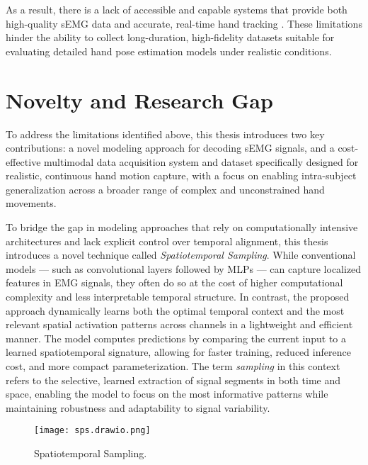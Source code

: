 As a result, there is a lack of accessible and capable systems that provide both high-quality sEMG data and accurate, real-time hand tracking \cite{graf2023combining}. These limitations hinder the ability to collect long-duration, high-fidelity datasets suitable for evaluating detailed hand pose estimation models under realistic conditions.

\section{Novelty and Research Gap}

To address the limitations identified above, this thesis introduces two key contributions: a novel modeling approach for decoding sEMG signals, and a cost-effective multimodal data acquisition system and dataset specifically designed for realistic, continuous hand motion capture, with a focus on enabling intra-subject generalization across a broader range of complex and unconstrained hand movements.

To bridge the gap in modeling approaches that rely on computationally intensive architectures and lack explicit control over temporal alignment, this thesis introduces a novel technique called \textit{Spatiotemporal Sampling}. While conventional models — such as convolutional layers followed by MLPs — can capture localized features in EMG signals, they often do so at the cost of higher computational complexity and less interpretable temporal structure. In contrast, the proposed approach dynamically learns both the optimal temporal context and the most relevant spatial activation patterns across channels in a lightweight and efficient manner. The model computes predictions by comparing the current input to a learned spatiotemporal signature, allowing for faster training, reduced inference cost, and more compact parameterization. The term \textit{sampling} in this context refers to the selective, learned extraction of signal segments in both time and space, enabling the model to focus on the most informative patterns while maintaining robustness and adaptability to signal variability.

\begin{figure}[H]
    \centering
    \texttt{[image: sps.drawio.png]}
    \caption{Spatiotemporal Sampling.}
    \label{fig:sps}
\end{figure}


